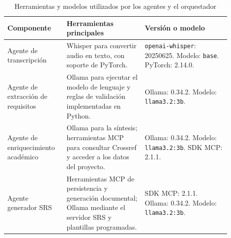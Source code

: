\begin{table}[H]
    \centering
    \caption{Herramientas y modelos utilizados por los agentes y el orquestador}
    \label{tab:tecnologias-agentes}

    \begingroup
    \footnotesize
    \setlength{\parskip}{0pt}
    \setlength{\tabcolsep}{4pt}
    \renewcommand{\arraystretch}{1.15}

    \begin{tabular}{
        |>{\raggedright\arraybackslash}p{0.23\linewidth}
        |>{\raggedright\arraybackslash}p{0.32\linewidth}
        |>{\raggedright\arraybackslash}p{0.35\linewidth}|
    }
        \hline
        \textbf{Componente} &
        \textbf{Herramientas principales} &
        \textbf{Versión o modelo} \\
        \hline

        Agente de transcripción &
        Whisper para convertir audio en texto,
        con soporte de PyTorch. &
        \texttt{openai-whisper}: 20250625.
        \newline
        Modelo: \texttt{base}.
        \newline
        PyTorch: 2.14.0. \\
        \hline

        Agente de extracción de requisitos &
        Ollama para ejecutar el modelo de lenguaje
        y reglas de validación implementadas
        en Python. &
        Ollama: 0.34.2.
        \newline
        Modelo: \texttt{llama3.2:3b}. \\
        \hline

        Agente de enriquecimiento académico &
        Ollama para la síntesis; herramientas MCP
        para consultar Crossref y acceder
        a los datos del proyecto. &
        Ollama: 0.34.2.
        \newline
        Modelo: \texttt{llama3.2:3b}.
        \newline
        SDK MCP: 2.1.1. \\
        \hline

        Agente generador SRS &
        Herramientas MCP de persistencia
        y generación documental; Ollama
        mediante el servidor SRS y plantillas
        programadas. &
        SDK MCP: 2.1.1.
        \newline
        Ollama: 0.34.2.
        \newline
        Modelo: \texttt{llama3.2:3b}. \\
        \hline


\end{tabular}
\end{table}
